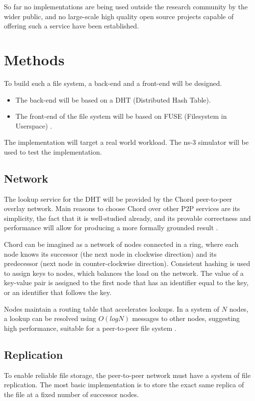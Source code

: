 \documentclass[8pt,a4paper]{article}
\begin{document}
So far no implementations are being used outside the research community by the wider public, and no large-scale high quality open source projects capable of offering such a service have been established.

\section{Methods}

To build such a file system, a back-end and a front-end will be designed.

\begin{itemize}
\item The back-end will be based on a DHT (Distributed Hash Table). 
\item The front-end of the file system will be based on FUSE (Filesystem in Userspace) \cite{fuse}.
\end{itemize}
The implementation will target a real world workload. The ns-3 \cite{ns3} simulator will be used to test the implementation.

\subsection{Network}
The lookup service for the DHT will be provided by the Chord peer-to-peer overlay network. Main reasons to choose Chord over other P2P services are its simplicity, the fact that it is well-studied already, and its provable correctness and performance will allow for producing a more formally grounded result \cite{chord}. %

Chord can be imagined as a network of nodes connected in a ring, where each node knows its successor (the next node in clockwise direction) and its predecessor (next node in counter-clockwise direction). Consistent hashing is used to assign keys to nodes, which balances the load on the network. The value of a key-value pair is assigned to the first node that has an identifier equal to the key, or an identifier that follows the key. 

Nodes maintain a routing table that accelerates lookups. In a system of $N$ nodes, a lookup can be resolved using $O(log N)$ messages to other nodes, suggesting high performance, suitable for a peer-to-peer file system \cite{chord}.

\subsection{Replication}
To enable reliable file storage, the peer-to-peer network must have a system of file replication. The most basic implementation is to store the exact same replica of the file at a fixed number of successor nodes. 
\end{document}
